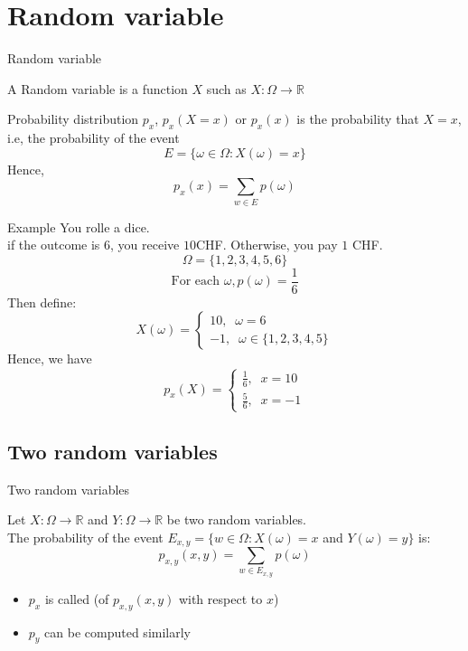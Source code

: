 \section{Random variable}
\begin{parag}{Random variable}
    \begin{definition}
        A Random variable is a function $X$ such as $X : \Omega \to \mathbb{R}$
    \end{definition}
\end{parag}
\begin{parag}{Probability distribution}
    $p_x$, $p_x(X = x)$ or $p_x(x)$ is the probability that $X = x$, i.e, the probability of the event
    \[E = \{\omega \in \Omega: X(\omega) = x\}\]
    Hence,
    \[p_x(x) = \sum_{w \in E}p(\omega)\]
    \begin{subparag}{Example}
        You rolle a dice.
        \\
        if the outcome is $6$, you receive $10$CHF. Otherwise, you pay $1$ CHF.
        \[\Omega = \{1, 2, 3, 4, 5,6\}\]
        \[\text{For each }\omega,p(\omega) = \frac{1}{6}\]
        Then define:
        \[X(\omega) = \begin{cases}
            10, \; \; \omega = 6 \\
            -1, \; \; \omega \in \{1, 2, 3, 4, 5\}
        \end{cases}\]
        Hence, we have
        \[p_x(X) = \begin{cases}
            \frac{1}{6}, \; \; x = 10 \\
            \frac{5}{6}, \; \; x = -1
        \end{cases}\]
    \end{subparag}
\end{parag}
\subsection{Two random variables}
\begin{parag}{Two random variables}
    \begin{definition}
        Let $X: \Omega \to \mathbb{R}$ and $Y: \Omega \to \mathbb{R}$ be two random variables.
        \\
        The probability of the event $E_{x, y} = \{w \in \Omega: X(\omega) = x$ and $Y(\omega) = y\}$ is:
        \[p_{x, y}(x, y) = \sum_{w \in E_{x, y}} p(\omega)\]
    \end{definition}
    \begin{itemize}
        \item $p_x$ is called  (of $p_{x, y}(x, y)$ with respect to $x$)
        \item $p_y$ can be computed similarly
    \end{itemize}
\end{parag}
